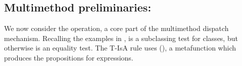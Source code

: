 %
%

\subsection{Multimethod preliminaries: \isaliteral}

\label{sec:isaformal}

We now consider the \isaliteral{} operation, a core part of the multimethod dispatch mechanism. 
Recalling the examples in ,
\isaliteral{} is
a subclassing test for classes, but otherwise is an equality test.
%
The T-IsA rule uses \isacompareliteral{}
(), a metafunction which produces the propositions for
\isaliteral{} expressions.

